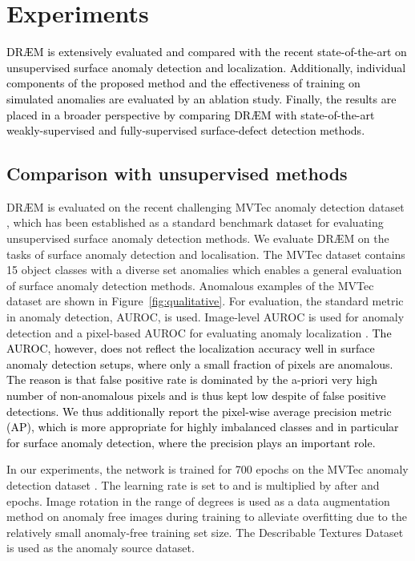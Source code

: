 \documentclass[10pt,twocolumn,letterpaper]{article}
\newcommand\ntext[1]{\textcolor{black}{#1}}
\begin{document}
\section{Experiments}
\ntext{DR{\AE}M is extensively evaluated and compared with the recent state-of-the-art on  unsupervised \ntext{surface} anomaly detection and localization. Additionally, individual components of the proposed method and the effectiveness of training on simulated anomalies are evaluated by an ablation study. Finally, the results are placed in a broader perspective by comparing DR{\AE}M with state-of-the-art weakly-supervised and fully-supervised surface-defect detection methods.}


\subsection{Comparison with unsupervised methods}

DR{\AE}M is evaluated on the recent challenging MVTec anomaly detection dataset \cite{bergmann2019mvtec}, which has been established as a standard benchmark dataset for evaluating unsupervised surface anomaly detection methods. We evaluate DR{\AE}M on the tasks of surface anomaly detection and localisation. The MVTec dataset contains 15 object classes with a diverse set anomalies which enables a general evaluation of surface anomaly detection methods. Anomalous examples of the MVTec dataset are shown in Figure~\ref{fig:qualitative}. For evaluation, the standard metric in anomaly detection, AUROC, is used. Image-level AUROC is used for anomaly detection and a pixel-based AUROC for evaluating anomaly localization \cite{bergmann2018improving, schlegl2017unsupervised,liu2018future, tang2020anomaly}. 
\ntext{The AUROC, however, does not reflect the localization accuracy well in surface anomaly detection setups, where only a small fraction of pixels are anomalous. The reason is that false positive rate is dominated by the a-priori very high number of non-anomalous pixels and is thus kept low despite of false positive detections.
We thus additionally report the pixel-wise average precision metric (AP), which is more appropriate for highly imbalanced classes and in particular for surface anomaly detection, where the precision plays an important role.}
 


In our experiments, the network is trained for 700 epochs on the MVTec anomaly detection dataset \cite{bergmann2019mvtec}. The learning rate is set to  and is multiplied by  after  and  epochs. Image rotation in the range of  degrees is used as a data augmentation method on anomaly free images during training to alleviate overfitting due to the relatively small anomaly-free training set size. The Describable Textures Dataset \cite{cimpoi2014describing} is used as the anomaly source dataset.
\end{document}
